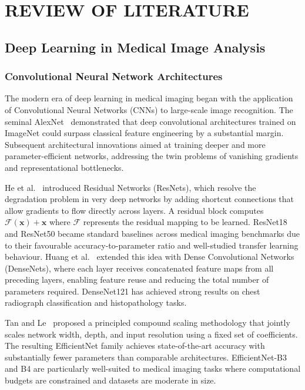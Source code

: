 
\chapter{REVIEW OF LITERATURE}

\section{Deep Learning in Medical Image Analysis}

\subsection{Convolutional Neural Network Architectures}

The modern era of deep learning in medical imaging began with the application of Convolutional Neural Networks (CNNs) to large-scale image recognition. The seminal AlexNet~\cite{krizhevsky2012imagenet} demonstrated that deep convolutional architectures trained on ImageNet could surpass classical feature engineering by a substantial margin. Subsequent architectural innovations aimed at training deeper and more parameter-efficient networks, addressing the twin problems of vanishing gradients and representational bottlenecks.

He et al.~\cite{he2016deep} introduced Residual Networks (ResNets), which resolve the degradation problem in very deep networks by adding shortcut connections that allow gradients to flow directly across layers. A residual block computes $\mathcal{F}(\mathbf{x}) + \mathbf{x}$ where $\mathcal{F}$ represents the residual mapping to be learned. ResNet18 and ResNet50 became standard baselines across medical imaging benchmarks due to their favourable accuracy-to-parameter ratio and well-studied transfer learning behaviour. Huang et al.~\cite{huang2017densely} extended this idea with Dense Convolutional Networks (DenseNets), where each layer receives concatenated feature maps from all preceding layers, enabling feature reuse and reducing the total number of parameters required. DenseNet121 has achieved strong results on chest radiograph classification and histopathology tasks.

Tan and Le~\cite{tan2019efficientnet} proposed a principled compound scaling methodology that jointly scales network width, depth, and input resolution using a fixed set of coefficients. The resulting EfficientNet family achieves state-of-the-art accuracy with substantially fewer parameters than comparable architectures. EfficientNet-B3 and B4 are particularly well-suited to medical imaging tasks where computational budgets are constrained and datasets are moderate in size.

